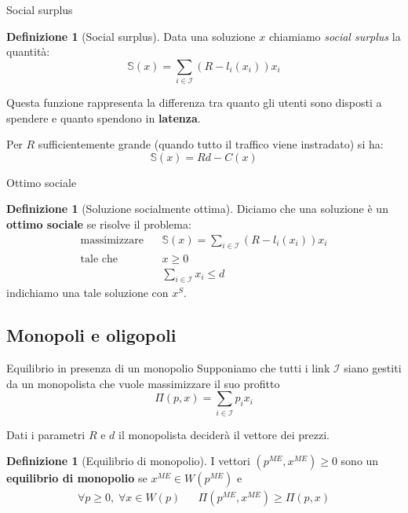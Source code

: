 \documentclass{beamer}
\newcounter{counter1}
\theoremstyle{plain}
\theoremstyle{definition}
\newtheorem{mydef}[counter1]{Definizione}
\theoremstyle{remark}
\newcommand{\pa}[1]{\left(#1\right)}
\begin{document}
\begin{frame}{Social surplus}
  \begin{mydef}[Social surplus]
    Data una soluzione $x$ chiamiamo \textit{social surplus} la
    quantità:
    \[ \mathbb{S}(x) = \sum _{i\in\mathcal{I}}\pa{ R -
        l_i\pa{x_i}}x_i \]
  \end{mydef}
  Questa funzione rappresenta la differenza tra quanto gli utenti sono
  disposti a spendere e quanto spendono in \textbf{latenza}.
  \vfill
  
  Per $R$ sufficientemente grande (quando tutto il traffico viene
  instradato) si ha:
  \[ \mathbb{S}(x) = Rd - C(x) \]
\end{frame}

\begin{frame}{Ottimo sociale}
  \begin{mydef}[Soluzione socialmente ottima]
    Diciamo che una soluzione è un \textbf{ottimo sociale} se risolve il
    problema:
    \begin{align*}
      \text{massimizzare }\;\; & \mathbb{S}(x) = \sum
                            _{i\in\mathcal{I}}\pa{ R - l_i\pa{x_i}}x_i
      \\
      \text{tale che }\;\; & x\ge 0\\
      & \sum _{i\in \mathcal{I}} x_i \le d
    \end{align*}
    indichiamo una tale soluzione con $x^S$.
  \end{mydef}
\end{frame}

\subsection{Monopoli e oligopoli}

\begin{frame}{Equilibrio in presenza di un monopolio}
  Supponiamo che tutti i link $\mathcal{I}$ siano gestiti da un
  monopolista che vuole massimizzare il suo profitto
  \[ \Pi (p,x) = \sum _{i\in\mathcal{I}} p_i x_i \]

  Dati i parametri $R$ e $d$ il monopolista deciderà il vettore dei
  prezzi.
  \begin{mydef}[Equilibrio di monopolio]
    I vettori $\pa{p^{ME},x^{ME}}\ge 0$ sono un \textbf{equilibrio di
      monopolio} se $x^{ME}\in W(p^{ME})$ e 
    \begin{align*}
      \forall p\ge 0,\; \forall x\in W(p) && \Pi \pa{p^{ME},x^{ME}}
                                             \ge \Pi \pa{p,x}
    \end{align*}
  \end{mydef}
\end{frame}
\end{document}
